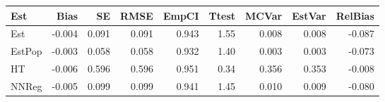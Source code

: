 
\begin{tabular}{lrrrrrrrr}
\toprule
Est & Bias & SE & RMSE & EmpCI & Ttest & MCVar & EstVar & RelBias\\
\midrule
Est & -0.004 & 0.091 & 0.091 & 0.943 & 1.55 & 0.008 & 0.008 & -0.087\\
EstPop & -0.003 & 0.058 & 0.058 & 0.932 & 1.40 & 0.003 & 0.003 & -0.073\\
HT & -0.006 & 0.596 & 0.596 & 0.951 & 0.34 & 0.356 & 0.353 & -0.008\\
NNReg & -0.005 & 0.099 & 0.099 & 0.941 & 1.45 & 0.010 & 0.009 & -0.080\\
\bottomrule
\end{tabular}